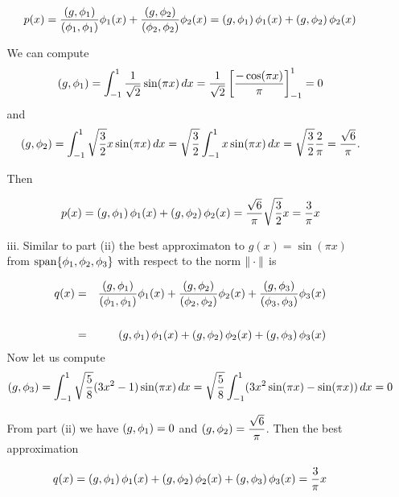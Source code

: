 \begin{solution}
\begin{enumerate}
\begin{itemize}
\begin{eqnarray*}
p(x) = \frac{\left( g,\phi_1 \right)}{\left( \phi_1, \phi_1 \right)} \phi_1(x) + \frac{\left( g,\phi_2 \right)}{\left( \phi_2, \phi_2 \right)} \phi_2(x) = \left( g,\phi_1 \right) \phi_1(x) + \left( g,\phi_2 \right) \phi_2(x)
\end{eqnarray*}

We can compute 
\[
\left( g,\phi_1 \right) = \int_{-1}^1 \frac{1}{\sqrt{2}} \sin(\pi x) \, dx =   \frac{1}{\sqrt{2}} \left[ \frac{-\cos (\pi x)}{\pi}\right]_{-1}^{1}=0
\]
and
 \[
\left( g,\phi_2 \right) = \int_{-1}^1 \sqrt{\frac{3}{2}} x \sin(\pi x) \, dx =  \sqrt{\frac{3}{2}} \int_{-1}^1 x \sin(\pi x) \, dx=  \sqrt{\frac{3}{2}}  \frac{2}{\pi} =  \frac{\sqrt{6}}{\pi}.
\]

Then

\begin{eqnarray*}
p(x) =  \left( g,\phi_1 \right) \phi_1(x) + \left( g,\phi_2 \right) \phi_2(x) =  \frac{\sqrt{6}}{\pi} \sqrt{\frac{3}{2}} x =\frac{3}{\pi} x
\end{eqnarray*}

\item[iii.] Similar to part (ii) the best approximaton to $g(x) = \sin(\pi x)$ from ${\rm span}\{\phi_1,\phi_2, \phi_3\}$ with respect to the norm $\|\cdot\|$ is

\begin{eqnarray*}
q(x) &=& \frac{\left( g,\phi_1 \right)}{\left( \phi_1, \phi_1 \right)} \phi_1(x) + \frac{\left( g,\phi_2 \right)}{\left( \phi_2, \phi_2 \right)} \phi_2(x) + \frac{\left( g,\phi_3 \right)}{\left( \phi_3, \phi_3 \right)} \phi_3(x)\\
\\
&=& \left( g,\phi_1 \right) \phi_1(x) + \left( g,\phi_2 \right) \phi_2(x) + \left( g,\phi_3 \right) \phi_3(x)
\end{eqnarray*}
Now let us compute 
 \[
\left( g,\phi_3 \right) = \int_{-1}^1 \sqrt{\frac{5}{8}}(3x^2 -1) \sin(\pi x) \, dx =  \sqrt{\frac{5}{8}}\int_{-1}^1(3x^2 \sin(\pi x) - \sin(\pi x))  \, dx = 0
\]

From part (ii) we have $ \left( g,\phi_1 \right) =0$ and $ \displaystyle{\left( g,\phi_2 \right) = \frac{\sqrt{6}}{\pi}}$. Then the best approximation 

\begin{eqnarray*}
q(x) = \left( g,\phi_1 \right) \phi_1(x) + \left( g,\phi_2 \right) \phi_2(x) + \left( g,\phi_3 \right) \phi_3(x) = \frac{3}{\pi} x
\end{eqnarray*}

\end{itemize}
\end{enumerate}
\end{solution}
